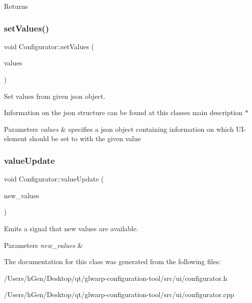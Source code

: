 \begin{DoxyReturn}{Returns}

\end{DoxyReturn}
\mbox{\label{class_configurator_abb86d4cefc42b8e79fc440e2b13dd9d8}} 
\subsubsection{\texorpdfstring{set\+Values()}{setValues()}}
{\footnotesize\ttfamily void Configurator\+::set\+Values (\begin{DoxyParamCaption}\item[{const Q\+Json\+Object \&}]{values }\end{DoxyParamCaption})}



Set values from given json object. 

Information on the json structure can be found at this classes main description $\ast$


\begin{DoxyParams}{Parameters}
{\em values} & specifies a json object containing information on which U\+I-\/element should be set to with the given value \\
\hline
\end{DoxyParams}
\mbox{\label{class_configurator_ab558c7a35d9d766fe3a7ae80326223f0}} 
\subsubsection{\texorpdfstring{value\+Update}{valueUpdate}}
{\footnotesize\ttfamily void Configurator\+::value\+Update (\begin{DoxyParamCaption}\item[{Q\+Json\+Object}]{new\+\_\+values }\end{DoxyParamCaption})\hspace{0.3cm}{\ttfamily [signal]}}



Emits a signal that new values are available. 


\begin{DoxyParams}{Parameters}
{\em new\+\_\+values} & \\
\hline
\end{DoxyParams}


The documentation for this class was generated from the following files\+:\begin{DoxyCompactItemize}
\item 
/\+Users/h\+Gen/\+Desktop/qt/glwarp-\/configuration-\/tool/src/ui/configurator.\+h\item 
/\+Users/h\+Gen/\+Desktop/qt/glwarp-\/configuration-\/tool/src/ui/configurator.\+cpp\end{DoxyCompactItemize}
